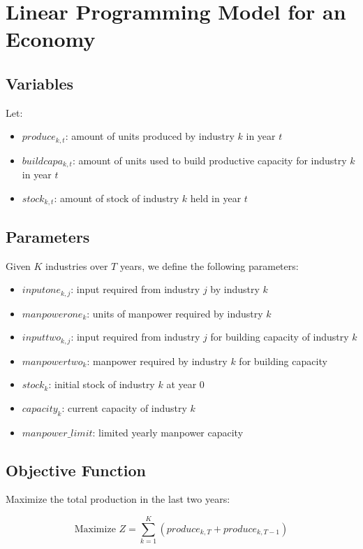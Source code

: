 \documentclass{article}
\begin{document}
\section*{Linear Programming Model for an Economy}

\subsection*{Variables}
Let:
\begin{itemize}
    \item \( produce_{k, t} \): amount of units produced by industry \( k \) in year \( t \)
    \item \( buildcapa_{k, t} \): amount of units used to build productive capacity for industry \( k \) in year \( t \)
    \item \( stock_{k, t} \): amount of stock of industry \( k \) held in year \( t \)
\end{itemize}

\subsection*{Parameters}
Given \( K \) industries over \( T \) years, we define the following parameters:
\begin{itemize}
    \item \( inputone_{k, j} \): input required from industry \( j \) by industry \( k \)
    \item \( manpowerone_{k} \): units of manpower required by industry \( k \)
    \item \( inputtwo_{k, j} \): input required from industry \( j \) for building capacity of industry \( k \)
    \item \( manpowertwo_{k} \): manpower required by industry \( k \) for building capacity
    \item \( stock_{k} \): initial stock of industry \( k \) at year 0
    \item \( capacity_{k} \): current capacity of industry \( k \)
    \item \( manpower\_limit \): limited yearly manpower capacity
\end{itemize}

\subsection*{Objective Function}
Maximize the total production in the last two years:

\[
\text{Maximize } Z = \sum_{k=1}^{K} \left( produce_{k, T} + produce_{k, T-1} \right)
\]
\end{document}
